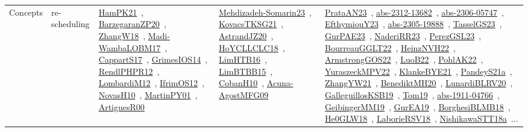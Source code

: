 {\begin{longtable}{lp{3cm}>{\raggedright\arraybackslash}p{6cm}>{\raggedright\arraybackslash}p{6cm}>{\raggedright\arraybackslash}p{8cm}}
Concepts & re-scheduling & \href{articles/HamPK21.pdf}{HamPK21}~\cite{HamPK21}, \href{papers/BarzegaranZP20.pdf}{BarzegaranZP20}~\cite{BarzegaranZP20}, \href{articles/ZhangW18.pdf}{ZhangW18}~\cite{ZhangW18}, \href{papers/Madi-WambaLOBM17.pdf}{Madi-WambaLOBM17}~\cite{Madi-WambaLOBM17}, \href{papers/CappartS17.pdf}{CappartS17}~\cite{CappartS17}, \href{articles/GrimesIOS14.pdf}{GrimesIOS14}~\cite{GrimesIOS14}, \href{papers/RendlPHPR12.pdf}{RendlPHPR12}~\cite{RendlPHPR12}, \href{articles/LombardiM12.pdf}{LombardiM12}~\cite{LombardiM12}, \href{papers/IfrimOS12.pdf}{IfrimOS12}~\cite{IfrimOS12}, \href{articles/NovasH10.pdf}{NovasH10}~\cite{NovasH10}, \href{articles/MartinPY01.pdf}{MartinPY01}~\cite{MartinPY01}, \href{articles/ArtiguesR00.pdf}{ArtiguesR00}~\cite{ArtiguesR00} & \href{papers/Mehdizadeh-Somarin23.pdf}{Mehdizadeh-Somarin23}~\cite{Mehdizadeh-Somarin23}, \href{papers/KovacsTKSG21.pdf}{KovacsTKSG21}~\cite{KovacsTKSG21}, \href{articles/AstrandJZ20.pdf}{AstrandJZ20}~\cite{AstrandJZ20}, \href{papers/HoYCLLCLC18.pdf}{HoYCLLCLC18}~\cite{HoYCLLCLC18}, \href{papers/LimHTB16.pdf}{LimHTB16}~\cite{LimHTB16}, \href{papers/LimBTBB15.pdf}{LimBTBB15}~\cite{LimBTBB15}, \href{papers/CobanH10.pdf}{CobanH10}~\cite{CobanH10}, \href{papers/Acuna-AgostMFG09.pdf}{Acuna-AgostMFG09}~\cite{Acuna-AgostMFG09} & \href{articles/PrataAN23.pdf}{PrataAN23}~\cite{PrataAN23}, \href{articles/abs-2312-13682.pdf}{abs-2312-13682}~\cite{abs-2312-13682}, \href{articles/abs-2306-05747.pdf}{abs-2306-05747}~\cite{abs-2306-05747}, \href{papers/EfthymiouY23.pdf}{EfthymiouY23}~\cite{EfthymiouY23}, \href{articles/abs-2305-19888.pdf}{abs-2305-19888}~\cite{abs-2305-19888}, \href{papers/TasselGS23.pdf}{TasselGS23}~\cite{TasselGS23}, \href{articles/GurPAE23.pdf}{GurPAE23}~\cite{GurPAE23}, \href{articles/NaderiRR23.pdf}{NaderiRR23}~\cite{NaderiRR23}, \href{papers/PerezGSL23.pdf}{PerezGSL23}~\cite{PerezGSL23}, \href{articles/BourreauGGLT22.pdf}{BourreauGGLT22}~\cite{BourreauGGLT22}, \href{articles/HeinzNVH22.pdf}{HeinzNVH22}~\cite{HeinzNVH22}, \href{papers/ArmstrongGOS22.pdf}{ArmstrongGOS22}~\cite{ArmstrongGOS22}, \href{papers/LuoB22.pdf}{LuoB22}~\cite{LuoB22}, \href{articles/PohlAK22.pdf}{PohlAK22}~\cite{PohlAK22}, \href{articles/YuraszeckMPV22.pdf}{YuraszeckMPV22}~\cite{YuraszeckMPV22}, \href{papers/KlankeBYE21.pdf}{KlankeBYE21}~\cite{KlankeBYE21}, \href{articles/PandeyS21a.pdf}{PandeyS21a}~\cite{PandeyS21a}, \href{articles/ZhangYW21.pdf}{ZhangYW21}~\cite{ZhangYW21}, \href{articles/BenediktMH20.pdf}{BenediktMH20}~\cite{BenediktMH20}, \href{articles/LunardiBLRV20.pdf}{LunardiBLRV20}~\cite{LunardiBLRV20}, \href{papers/GalleguillosKSB19.pdf}{GalleguillosKSB19}~\cite{GalleguillosKSB19}, \href{papers/Tom19.pdf}{Tom19}~\cite{Tom19}, \href{articles/abs-1911-04766.pdf}{abs-1911-04766}~\cite{abs-1911-04766}, \href{papers/GeibingerMM19.pdf}{GeibingerMM19}~\cite{GeibingerMM19}, \href{articles/GurEA19.pdf}{GurEA19}~\cite{GurEA19}, \href{articles/BorghesiBLMB18.pdf}{BorghesiBLMB18}~\cite{BorghesiBLMB18}, \href{papers/He0GLW18.pdf}{He0GLW18}~\cite{He0GLW18}, \href{articles/LaborieRSV18.pdf}{LaborieRSV18}~\cite{LaborieRSV18}, \href{papers/NishikawaSTT18a.pdf}{NishikawaSTT18a}~\cite{NishikawaSTT18a}... 
\end{longtable}}
